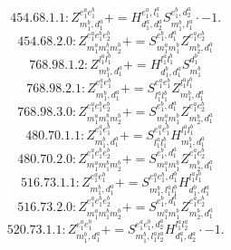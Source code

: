 \documentclass[letterpaper,10pt,fleqn,leqno,onecolumn]{article}
\begin{document}
\begin{equation} \;\;\;\;\;\;  454.68.1.1: Z^{e_{1}^{a}e_{1}^{b}}_{m_{1}^{b},d_{1}^{a}}+=H^{e_{1}^{a},l_{1}^{a}}_{d_{1}^{a},d_{2}^{a}}S^{e_{1}^{b},d_{2}^{a}}_{m_{1}^{b},l_{1}^{a}}\cdot -1. \end{equation}
\begin{equation} \;\;\;\;\;\;  454.68.2.0: Z^{e_{1}^{a}e_{1}^{b}e_{2}^{b}}_{m_{1}^{a}m_{1}^{b}m_{2}^{b}}+=S^{e_{1}^{b},d_{1}^{a}}_{m_{1}^{a}m_{1}^{b}}Z^{e_{1}^{a}e_{2}^{b}}_{m_{2}^{b},d_{1}^{a}} \end{equation}
\begin{equation} \;\;\;\;\;\;  768.98.1.2: Z^{l_{1}^{a}l_{1}^{b}}_{m_{1}^{b},d_{1}^{a}}+=H^{l_{1}^{a}l_{1}^{b}}_{d_{1}^{b},d_{1}^{a}}S^{d_{1}^{b}}_{m_{1}^{b}} \end{equation}
\begin{equation} \;\;\;\;\;\;  768.98.2.1: Z^{e_{1}^{a}e_{1}^{b}}_{m_{1}^{b},d_{1}^{a}}+=S^{e_{1}^{a}e_{1}^{b}}_{l_{1}^{a}l_{1}^{b}}Z^{l_{1}^{a}l_{1}^{b}}_{m_{1}^{b},d_{1}^{a}} \end{equation}
\begin{equation} \;\;\;\;\;\;  768.98.3.0: Z^{e_{1}^{a}e_{1}^{b}e_{2}^{b}}_{m_{1}^{a}m_{1}^{b}m_{2}^{b}}+=S^{e_{1}^{b},d_{1}^{a}}_{m_{1}^{a}m_{1}^{b}}Z^{e_{1}^{a}e_{2}^{b}}_{m_{2}^{b},d_{1}^{a}} \end{equation}
\begin{equation} \;\;\;\;\;\;  480.70.1.1: Z^{e_{1}^{a}e_{1}^{b}}_{m_{1}^{b},d_{1}^{a}}+=S^{e_{1}^{a}e_{1}^{b}}_{l_{1}^{a}l_{1}^{b}}H^{l_{1}^{a}l_{1}^{b}}_{m_{1}^{b},d_{1}^{a}} \end{equation}
\begin{equation} \;\;\;\;\;\;  480.70.2.0: Z^{e_{1}^{a}e_{1}^{b}e_{2}^{b}}_{m_{1}^{a}m_{1}^{b}m_{2}^{b}}+=S^{e_{1}^{b},d_{1}^{a}}_{m_{1}^{a}m_{1}^{b}}Z^{e_{1}^{a}e_{2}^{b}}_{m_{2}^{b},d_{1}^{a}} \end{equation}
\begin{equation} \;\;\;\;\;\;  516.73.1.1: Z^{e_{1}^{a}e_{1}^{b}}_{m_{1}^{b},d_{1}^{a}}+=S^{e_{1}^{a}e_{1}^{b},d_{1}^{b}}_{m_{1}^{b},l_{1}^{a}l_{1}^{b}}H^{l_{1}^{a}l_{1}^{b}}_{d_{1}^{b},d_{1}^{a}} \end{equation}
\begin{equation} \;\;\;\;\;\;  516.73.2.0: Z^{e_{1}^{a}e_{1}^{b}e_{2}^{b}}_{m_{1}^{a}m_{1}^{b}m_{2}^{b}}+=S^{e_{1}^{b},d_{1}^{a}}_{m_{1}^{a}m_{1}^{b}}Z^{e_{1}^{a}e_{2}^{b}}_{m_{2}^{b},d_{1}^{a}} \end{equation}
\begin{equation} \;\;\;\;\;\;  520.73.1.1: Z^{e_{1}^{a}e_{1}^{b}}_{m_{1}^{b},d_{1}^{a}}+=S^{e_{1}^{a}e_{1}^{b},d_{2}^{a}}_{m_{1}^{b},l_{1}^{a}l_{2}^{a}}H^{l_{1}^{a}l_{2}^{a}}_{d_{1}^{a},d_{2}^{a}}\cdot -1. \end{equation}
\end{document}
